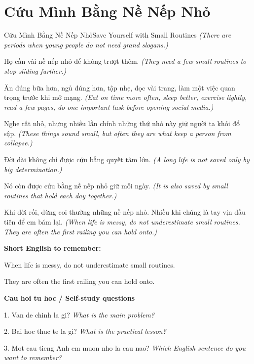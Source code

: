 \section{Cứu Mình Bằng Nề Nếp Nhỏ}
\begin{truyen}{Cứu Mình Bằng Nề Nếp Nhỏ}{Save Yourself with Small Routines}
\textit{(There are periods when young people do not need grand slogans.)}

Họ cần vài nề nếp nhỏ để không trượt thêm.
\textit{(They need a few small routines to stop sliding further.)}

Ăn đúng bữa hơn, ngủ đúng hơn, tập nhẹ, đọc vài trang, làm một việc quan trọng trước khi mở mạng.
\textit{(Eat on time more often, sleep better, exercise lightly, read a few pages, do one important task before opening social media.)}

Nghe rất nhỏ, nhưng nhiều lần chính những thứ nhỏ này giữ người ta khỏi đổ sập.
\textit{(These things sound small, but often they are what keep a person from collapse.)}

Đời dài không chỉ được cứu bằng quyết tâm lớn.
\textit{(A long life is not saved only by big determination.)}

Nó còn được cứu bằng nề nếp nhỏ giữ mỗi ngày.
\textit{(It is also saved by small routines that hold each day together.)}

\end{truyen}

\begin{baihoc}
Khi đời rối, đừng coi thường những nề nếp nhỏ. Nhiều khi chúng là tay vịn đầu tiên để em bám lại.
\textit{(When life is messy, do not underestimate small routines. They are often the first railing you can hold onto.)}
\end{baihoc}

\begin{ghinhoanh}
\textbf{Short English to remember:}

When life is messy, do not underestimate small routines.

They are often the first railing you can hold onto.

\end{ghinhoanh}

\begin{tuhocnhanh}
\textbf{Cau hoi tu hoc / Self-study questions}

1. Van de chinh la gi? \textit{What is the main problem?}

2. Bai hoc thuc te la gi? \textit{What is the practical lesson?}

3. Mot cau tieng Anh em muon nho la cau nao? \textit{Which English sentence do you want to remember?}
\end{tuhocnhanh}
\ngancach


